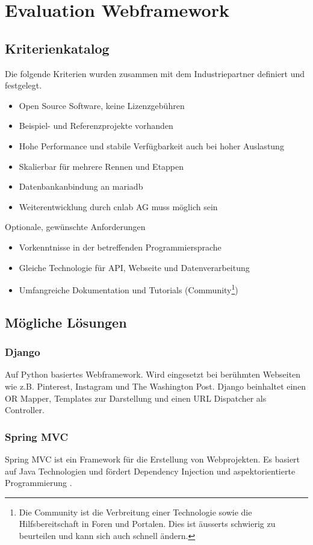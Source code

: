 \section{Evaluation Webframework}
\label{sec:evaluationwebframework}
\subsection{Kriterienkatalog}
Die folgende Kriterien wurden zusammen mit dem Industriepartner definiert und festgelegt.
\begin{itemize}
\item Open Source Software, keine Lizenzgebühren
\item Beispiel- und Referenzprojekte vorhanden
\item Hohe Performance und stabile Verfügbarkeit auch bei hoher Auslastung
\item Skalierbar für mehrere Rennen und Etappen
\item Datenbankanbindung an \gls{mariadb}
\item Weiterentwicklung durch cnlab AG muss möglich sein
\end{itemize}
Optionale, gewünschte Anforderungen
\begin{itemize}
\item Vorkenntnisse in der betreffenden Programmiersprache
\item Gleiche Technologie für API, Webseite und Datenverarbeitung
\item Umfangreiche Dokumentation und Tutorials (Community\footnote{Die Community ist die Verbreitung einer Technologie sowie die Hilfsbereitschaft in Foren und Portalen. Dies ist äusserts schwierig zu beurteilen und kann sich auch schnell ändern.})
\end{itemize}
\subsection{Mögliche Lösungen}
\subsubsection{Django}
Auf Python basiertes Webframework. Wird eingesetzt bei berühmten Webseiten wie z.B. Pinterest, Instagram und The Washington Post.  Django beinhaltet einen OR Mapper, Templates zur Darstellung und einen URL Dispatcher als Controller.
\subsubsection{Spring MVC}
Spring MVC ist ein Framework für die Erstellung von Webprojekten. Es basiert auf Java Technologien und fördert Dependency Injection  und aspektorientierte Programmierung .
